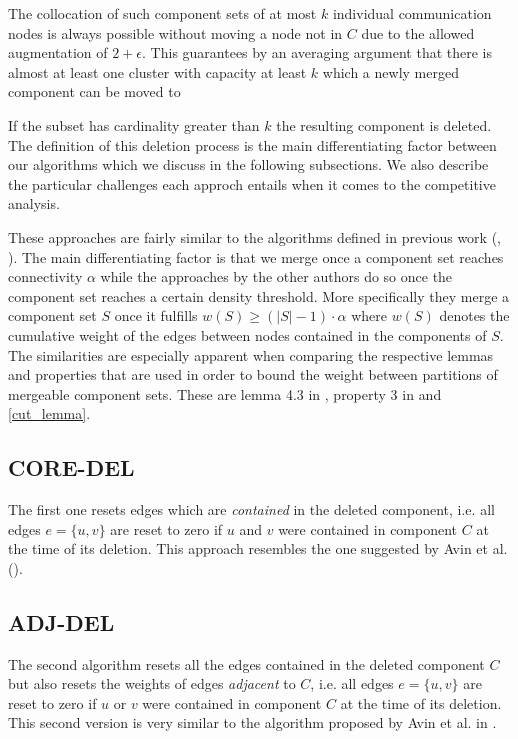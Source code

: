 \documentclass[a4paper,xcolor=dvipsnames, tikz, 12pt]{article}
\theoremstyle{definition}
\begin{document}
	The collocation of such component sets of at most $k$ individual communication nodes is always possible without moving a node not in $C$ due to the allowed augmentation of $2+\epsilon$. This guarantees by an averaging argument that there is almost at least one cluster with capacity at least $k$ which a newly merged component can be moved to 
	
	If the subset has cardinality greater than $k$ the resulting component is deleted. The definition of this deletion process is the main differentiating factor between our algorithms which we discuss in the following subsections. We also describe the particular challenges each approch entails when it comes to the competitive analysis.
	
	These approaches are fairly similar to the algorithms defined in previous work (\cite{Avin2015}, \cite{Avin2015a}). The main differentiating factor is that we merge once a component set reaches connectivity $\alpha$ while the approaches by the other authors do so once the component set reaches a certain density threshold. More specifically they merge a component set $S$ once it fulfills $w(S)\geq(|S|-1)\cdot\alpha$ where $w(S)$ denotes the cumulative weight of the edges between nodes contained in the components of $S$.
	The similarities are especially apparent when comparing the respective lemmas and properties that are used in order to bound the weight between partitions of mergeable component sets. These are lemma 4.3 in \cite{Avin2015a}, property 3 in \cite{Avin2015} and \cref{cut_lemma}.
	
	\subsection{CORE-DEL}
	
	 The first one resets edges which are \textit{contained} in the deleted component, i.e. all edges $e=\{u,v\}$ are reset to zero if $u$ and $v$ were contained in component $C$ at the time of its deletion. This approach resembles the one suggested by Avin et al. (\cite{Avin2015a}).
	 
	 \subsection{ADJ-DEL}
	
	The second algorithm resets all the edges contained in the deleted component $C$ but also resets the weights of edges \textit{adjacent} to $C$, i.e. all edges $e=\{u,v\}$ are reset to zero if $u$ or $v$ were contained in component $C$ at the time of its deletion. This second version is very similar to the algorithm proposed by Avin et al. in \cite{Avin2015}.
	
\end{document}

